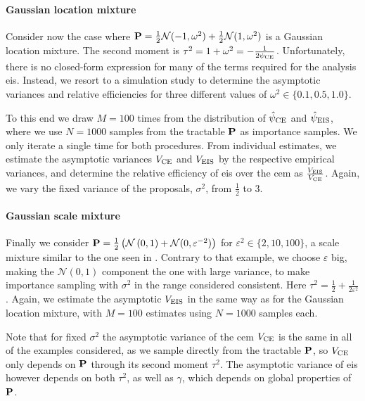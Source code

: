 \begin{example}
    \paragraph{Gaussian location mixture}
    Consider now the case where $\P = \frac{1}{2} \mathcal N(-1, \omega^{2}) + \frac{1}{2}\mathcal N(1, \omega^{2})$ is a Gaussian location mixture. The second moment is $\tau^{2} = 1 + \omega^{2} = -\frac{1}{2\pce}$. Unfortunately, there is no closed-form expression for many of the terms required for the analysis \gls{eis}. Instead, we resort to a simulation study to determine the asymptotic variances and relative efficiencies for three different values of $\omega^{2} \in \{0.1, 0.5, 1.0\}$. 
    
    To this end we draw $M = 100$ times from the distribution of $\hpce$ and $\hpeis$, where we use $N=1000$ samples from the tractable $\P$ as importance samples. We only iterate a single time for both procedures. From individual estimates, we estimate the asymptotic variances $V_{\ce}$ and $V_{\eis}$ by the respective empirical variances, and determine the relative efficiency of \gls{eis} over the \gls{cem} as $ \frac{V_{\eis}}{V_{\ce}}$. Again, we vary the fixed variance of the proposals, $\sigma^{2}$, from $\frac{1}{2}$ to $3$. 
    
    \paragraph{Gaussian scale mixture}
    Finally we consider $\P = \frac{1}{2} \left(\mathcal N \left( 0, 1 \right) + \mathcal N (0, \varepsilon^{-2}) \right)$ for $\varepsilon^{2} \in \{2, 10, 100\}$, a scale mixture similar to the one seen in . Contrary to that example, we choose $\varepsilon$ big, making the $\mathcal N(0,1)$ component the one with large variance, to make importance sampling with $\sigma^{2}$ in the range considered consistent. 
    Here $\tau^{2} = \frac{1}{2} + \frac{1}{2\varepsilon^{2}}$. 
    Again, we estimate the asymptotic $V_{\eis}$ in the same way as for the Gaussian location mixture, with $M=100$ estimates using $N=1000$ samples each. 
\end{example}

Note that for fixed $\sigma^{2}$ the asymptotic variance of the \acrshort{cem} $V_{\ce}$ is the same in all of the examples considered, as we sample directly from the tractable $\P$, so $V_{\ce}$ only depends on $\P$ through its second moment $\tau^{2}$. 
The asymptotic variance of \acrshort{eis} however depends on both $\tau^{2}$, as well as $\gamma$, which depends on global properties of $\P$. 

